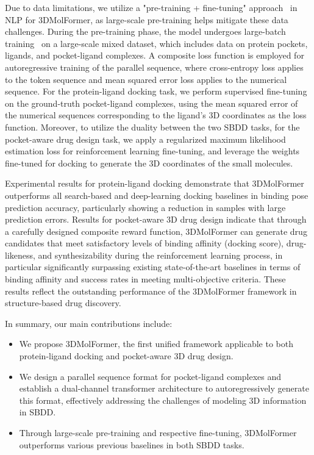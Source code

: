 Due to data limitations, we utilize a "pre-training + fine-tuning" approach~\citep{DeepLearning} in NLP for 3DMolFormer, as large-scale pre-training helps mitigate these data challenges.
During the pre-training phase, the model undergoes large-batch training~\citep{large-batch-training} on a large-scale mixed dataset, which includes data on protein pockets, ligands, and pocket-ligand complexes. A composite loss function is employed for autoregressive training of the parallel sequence, where cross-entropy loss applies to the token sequence and mean squared error loss applies to the numerical sequence. 
For the protein-ligand docking task, we perform supervised fine-tuning on the ground-truth pocket-ligand complexes, using the mean squared error of the numerical sequences corresponding to the ligand's 3D coordinates as the loss function. Moreover, to utilize the duality between the two SBDD tasks, for the pocket-aware drug design task, we apply a regularized maximum likelihood estimation loss for reinforcement learning fine-tuning, and leverage the weights fine-tuned for docking to generate the 3D coordinates of the small molecules.

Experimental results for protein-ligand docking demonstrate that 3DMolFormer outperforms all search-based and deep-learning docking baselines in binding pose prediction accuracy, particularly showing a reduction in samples with large prediction errors. Results for pocket-aware 3D drug design indicate that through a carefully designed composite reward function, 3DMolFormer can generate drug candidates that meet satisfactory levels of binding affinity (docking score), drug-likeness, and synthesizability during the reinforcement learning process, in particular significantly surpassing existing state-of-the-art baselines in terms of binding affinity and success rates in meeting multi-objective criteria. These results reflect the outstanding performance of the 3DMolFormer framework in structure-based drug discovery.

In summary, our main contributions include:
\begin{itemize}[leftmargin=*]
    \item We propose 3DMolFormer, the first unified framework applicable to both protein-ligand docking and pocket-aware 3D drug design.
    \item We design a parallel sequence format for pocket-ligand complexes and establish a dual-channel transformer architecture to autoregressively generate this format, effectively addressing the challenges of modeling 3D information in SBDD.
    \item Through large-scale pre-training and respective fine-tuning, 3DMolFormer outperforms various previous baselines in both SBDD tasks.
\end{itemize}

